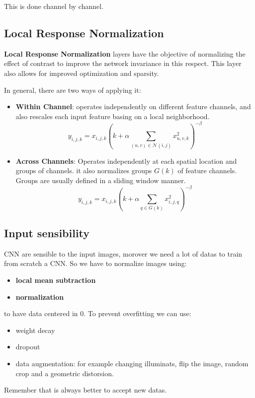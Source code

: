 This is done channel by channel.
\subsection{Local Response Normalization}
\textbf{Local Response Normalization} layers have the objective of normalizing the 
effect of contrast to improve the network invariance in this respect. This layer 
also allows for improved optimization and sparsity.

In general, there are two ways of applying it:
\begin{itemize}
    \item \textbf{Within Channel}: operates independently on different feature channels, and also rescales each input feature basing on a local neighborhood.
    \begin{equation}
        y_{i, j, k} = x_{i, j, k} \left(k + \alpha \sum_{(u, v) \in \mathcal{N}(i, j)} x_{u, v, k}^2 \right)^{-\beta}
    \end{equation}
    \item \textbf{Across Channels}:  Operates independently at each spatial location and groups of channels. it also normalizes groups $G(k)$ of feature channels. Groups are usually defined in a sliding window manner.
    \begin{equation}
        y_{i, j, k} = x_{i, j, k} \left(k + \alpha \sum_{q \in G(k)} x_{i, j, q}^2 \right)^{-\beta}
    \end{equation}
\end{itemize}

\subsection{Input sensibility}
CNN are sensible to the input images, morover we need a lot of datas to train from 
scratch a CNN. So we have to normalize images using:
\begin{itemize}
    \item \textbf{local mean subtraction}
    \item \textbf{normalization}
\end{itemize}
to have data centered in 0. To prevent overfitting we can use:
\begin{itemize}
    \item weight decay
    \item dropout
    \item data augmentation: for example changing illuminats, flip the image, random 
    crop and a geometric distorsion.
\end{itemize}

Remember that is always better to accept new datas.
